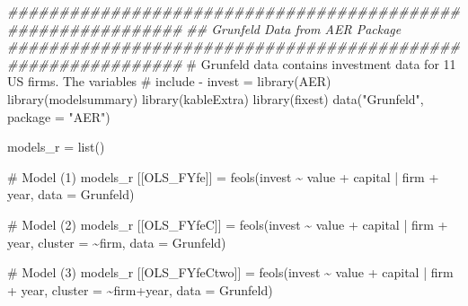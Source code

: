 \documentclass[
  letterpaper,
  DIV=11,
  numbers=noendperiod]{scrreprt}
\newenvironment{Shaded}{\begin{snugshade}}{\end{snugshade}}
\newcommand{\AttributeTok}[1]{\textcolor[rgb]{0.40,0.45,0.13}{#1}}
\newcommand{\CommentTok}[1]{\textcolor[rgb]{0.37,0.37,0.37}{#1}}
\newcommand{\DocumentationTok}[1]{\textcolor[rgb]{0.37,0.37,0.37}{\textit{#1}}}
\newcommand{\FunctionTok}[1]{\textcolor[rgb]{0.28,0.35,0.67}{#1}}
\newcommand{\NormalTok}[1]{\textcolor[rgb]{0.00,0.23,0.31}{#1}}
\newcommand{\OtherTok}[1]{\textcolor[rgb]{0.00,0.23,0.31}{#1}}
\newcommand{\SpecialCharTok}[1]{\textcolor[rgb]{0.37,0.37,0.37}{#1}}
\newcommand{\StringTok}[1]{\textcolor[rgb]{0.13,0.47,0.30}{#1}}
\begin{document}
\begin{Shaded}
\begin{Highlighting}[]
\DocumentationTok{\#\#\#\#\#\#\#\#\#\#\#\#\#\#\#\#\#\#\#\#\#\#\#\#\#\#\#\#\#\#\#\#\#\#\#\#\#\#\#\#\#\#\#\#\#\#\#\#\#\#\#\#\#\#\#\#\#\#\#\#\#}
\DocumentationTok{\#\# Grunfeld Data from AER Package}
\DocumentationTok{\#\#\#\#\#\#\#\#\#\#\#\#\#\#\#\#\#\#\#\#\#\#\#\#\#\#\#\#\#\#\#\#\#\#\#\#\#\#\#\#\#\#\#\#\#\#\#\#\#\#\#\#\#\#\#\#\#\#\#\#\#}
\CommentTok{\# Grunfeld data contains investment data for 11 US firms. The variables }
\CommentTok{\# include {-} invest = }
\FunctionTok{library}\NormalTok{(AER)}
\FunctionTok{library}\NormalTok{(modelsummary)}
\FunctionTok{library}\NormalTok{(kableExtra)}
\FunctionTok{library}\NormalTok{(fixest)}
\FunctionTok{data}\NormalTok{(}\StringTok{"Grunfeld"}\NormalTok{, }\AttributeTok{package =} \StringTok{"AER"}\NormalTok{)}

\NormalTok{models\_r }\OtherTok{=} \FunctionTok{list}\NormalTok{()}

\CommentTok{\# Model (1)}
\NormalTok{models\_r [[}\StringTok{\textquotesingle{}OLS\_FYfe\textquotesingle{}}\NormalTok{]] }\OtherTok{=} \FunctionTok{feols}\NormalTok{(invest }\SpecialCharTok{\textasciitilde{}}\NormalTok{ value }\SpecialCharTok{+}\NormalTok{ capital }\SpecialCharTok{|}\NormalTok{ firm }\SpecialCharTok{+}\NormalTok{ year, }\AttributeTok{data =}\NormalTok{ Grunfeld)}

\CommentTok{\# Model (2)}
\NormalTok{models\_r [[}\StringTok{\textquotesingle{}OLS\_FYfeC\textquotesingle{}}\NormalTok{]] }\OtherTok{=} \FunctionTok{feols}\NormalTok{(invest }\SpecialCharTok{\textasciitilde{}}\NormalTok{ value }\SpecialCharTok{+}\NormalTok{ capital }\SpecialCharTok{|}\NormalTok{ firm }\SpecialCharTok{+}\NormalTok{ year,}
\AttributeTok{cluster =} \SpecialCharTok{\textasciitilde{}}\NormalTok{firm,  }
\AttributeTok{data =}\NormalTok{ Grunfeld)}

\CommentTok{\# Model (3)}
\NormalTok{models\_r [[}\StringTok{\textquotesingle{}OLS\_FYfeCtwo\textquotesingle{}}\NormalTok{]] }\OtherTok{=} \FunctionTok{feols}\NormalTok{(invest }\SpecialCharTok{\textasciitilde{}}\NormalTok{ value }\SpecialCharTok{+}\NormalTok{ capital }\SpecialCharTok{|}\NormalTok{ firm }\SpecialCharTok{+}\NormalTok{ year,}
\AttributeTok{cluster =} \SpecialCharTok{\textasciitilde{}}\NormalTok{firm}\SpecialCharTok{+}\NormalTok{year,  }
\AttributeTok{data =}\NormalTok{ Grunfeld)}


\end{Highlighting}
\end{Shaded}
\end{document}

